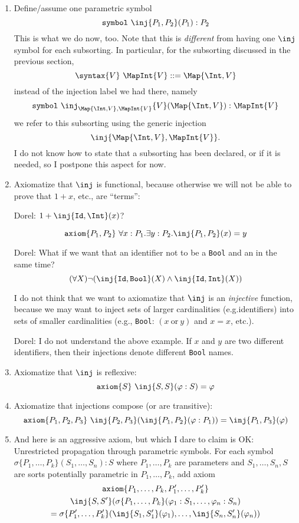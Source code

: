 \documentclass{article}
\newcommand\comment[2]{\par\noindent\color{red}#1: #2\color{black}\par\noindent}
\newcommand\dl{\comment{Dorel}}
\theoremstyle{definition}
\theoremstyle{definition}
\theoremstyle{definition}
\theoremstyle{theorem}
\theoremstyle{theorem}
\theoremstyle{theorem}
\newcommand{\KWsymbol}{\texttt{symbol}}
\newcommand{\axiom}{\texttt{axiom}}
\begin{document}
\begin{enumerate}[label=(\arabic*)]
\item\label{assume-inj}
Define/assume one parametric symbol
\[\KWsymbol\ \inj\{P_1,P_2\}(P_1):P_2\]
This is what we do now, too.
Note that this is \emph{different} from having one \(\inj\)
symbol for each subsorting.
In particular, for the subsorting discussed in the previous section,
\[\syntax\{V\}\ \MapInt{V}::=\Map{\Int,V}\]
instead of the injection label we had there, namely
\[\KWsymbol\ \inj_{\Map{\Int,V},\MapInt{V}}\{V\}(\Map{\Int,V}):\MapInt{V}\]
we refer to this subsorting using the generic injection
\[\inj\{\Map{\Int,V},\MapInt{V}\}.\]
I do not know how to state that a subsorting has been declared,
or if it is needed, so I postpone this aspect for now.

\item\label{axiom-functional}
Axiomatize that \(\inj\) is functional, because otherwise we will not
be able to prove that \(1+x\), etc., are ``terms'':
\dl{{\(1 + \inj\{\texttt{Id}, \Int\}(x)\)}?}
\[\axiom\{P_1,P_2\}\ \forall x:P_1.\exists y:P_2.\inj\{P_1,P_2\}(x)=y\]
\dl{What if we want that an identifier not to be a \texttt{Bool} and an \Int{} in the same time?\\
\[(\forall X)\neg (\inj\{\texttt{Id},\texttt{Bool}\}(X)
  \land \inj\{\texttt{Id},\texttt{Int}\}(X))\]}
I do not think that we want to axiomatize that \(\inj\) is an
\emph{injective} function, because we may want to inject sets of larger
cardinalities (e.g.identifiers) into sets of smaller cardinalities
(e.g., \texttt{Bool}: \((x\ \text{or}\ y)\) and \(x=x\), etc.).
\dl{I do not understand the above example. If $x$ and $y$ are two different identifiers, then their injections denote different \texttt{Bool} names.}

\item\label{axiom-reflexive}
Axiomatize that \(\inj\) is reflexive:
\[\axiom\{S\}\ \inj\{S,S\}(\varphi:S) = \varphi\]

\item\label{axiom-transitive}
Axiomatize that injections compose (or are transitive):
\[\axiom\{P_1,P_2,P_3\}\ \inj\{P_2,P_3\}(\inj\{P_1,P_2\}(\varphi:P_1))
 = \inj\{P_1,P_3\}(\varphi)\]

\item\label{axiom-parametric-symbol}
And here is an aggressive axiom, but which I dare to claim is OK:
Unrestricted propagation through parametric symbols.
For each symbol \(\sigma\{P_1,\ldots,P_k\}(S_1,\ldots,S_n):S\)
where \(P_1,\ldots,P_k\) are parameters and
\(S_1,\ldots,S_n,S\) are sorts potentially parametric in
\(P_1,\ldots,P_k\), add axiom
\begin{multline*}
\axiom\{P_1,\ldots,P_k,P'_1,\ldots,P'_k\}\\
\inj\{S,S'\}(\sigma\{P_1,\ldots,P_k\}(\varphi_1:S_1,\ldots,\varphi_n:S_n)\\
= \sigma\{P'_1,\ldots,P'_k\}(\inj\{S_1,S'_1\}(\varphi_1),\ldots,\inj\{S_n,S'_n\}(\varphi_n))
\end{multline*}
\end{enumerate}
\end{document}
